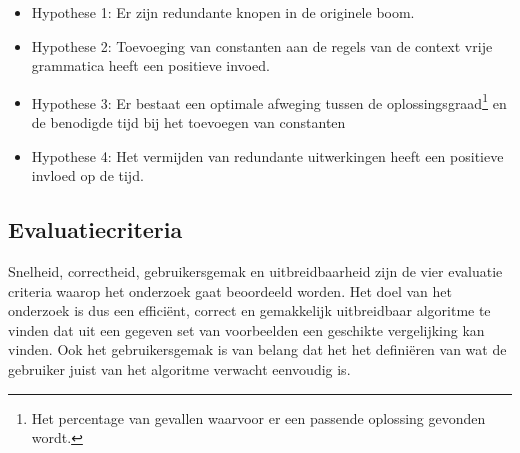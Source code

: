 \documentclass[Main.tex]{subfiles}
\begin{document}
\begin{itemize}
\item Hypothese 1: Er zijn redundante knopen in de originele boom.
\item Hypothese 2: Toevoeging van constanten aan de regels van de context vrije grammatica heeft een positieve invoed.
\item Hypothese 3: Er bestaat een optimale afweging tussen de oplossingsgraad\footnote{\label{note:oplossingsgraad}Het percentage van gevallen waarvoor er een passende oplossing gevonden wordt.} en de benodigde tijd bij het toevoegen van constanten
\item Hypothese 4: Het vermijden van redundante uitwerkingen heeft een positieve invloed op de tijd. 
\end{itemize}

\subsection{Evaluatiecriteria}

Snelheid, correctheid, gebruikersgemak en uitbreidbaarheid zijn de vier evaluatie criteria waarop het onderzoek gaat beoordeeld worden. Het doel van het onderzoek is dus een effici\"ent, correct en gemakkelijk uitbreidbaar algoritme te vinden dat uit een gegeven set van voorbeelden een geschikte vergelijking kan vinden. Ook het gebruikersgemak is van belang dat het het defini\"eren van wat de gebruiker juist van het algoritme verwacht eenvoudig is.
\end{document}
